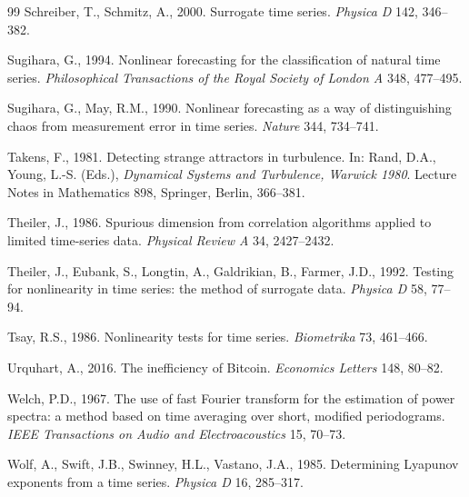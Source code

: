 \documentclass[11pt,a4paper]{article}
\begin{document}
\begin{thebibliography}{99}
Schreiber, T., Schmitz, A., 2000. Surrogate time series. \emph{Physica D} 142, 346--382.

Sugihara, G., 1994. Nonlinear forecasting for the classification of natural time series. \emph{Philosophical
Transactions of the Royal Society of London A} 348, 477--495.

Sugihara, G., May, R.M., 1990. Nonlinear forecasting as a way of distinguishing chaos from measurement error in time
series. \emph{Nature} 344, 734--741.

Takens, F., 1981. Detecting strange attractors in turbulence. In: Rand, D.A., Young, L.-S. (Eds.), \emph{Dynamical
Systems and Turbulence, Warwick 1980}. Lecture Notes in Mathematics 898, Springer, Berlin, 366--381.

Theiler, J., 1986. Spurious dimension from correlation algorithms applied to limited time-series data. \emph{Physical
Review A} 34, 2427--2432.

Theiler, J., Eubank, S., Longtin, A., Galdrikian, B., Farmer, J.D., 1992. Testing for nonlinearity in time series: the
method of surrogate data. \emph{Physica D} 58, 77--94.

Tsay, R.S., 1986. Nonlinearity tests for time series. \emph{Biometrika} 73, 461--466.

Urquhart, A., 2016. The inefficiency of Bitcoin. \emph{Economics Letters} 148, 80--82.

Welch, P.D., 1967. The use of fast Fourier transform for the estimation of power spectra: a method based on time
averaging over short, modified periodograms. \emph{IEEE Transactions on Audio and Electroacoustics} 15, 70--73.

Wolf, A., Swift, J.B., Swinney, H.L., Vastano, J.A., 1985. Determining Lyapunov exponents from a time series.
\emph{Physica D} 16, 285--317.

\end{thebibliography}
\end{document}
